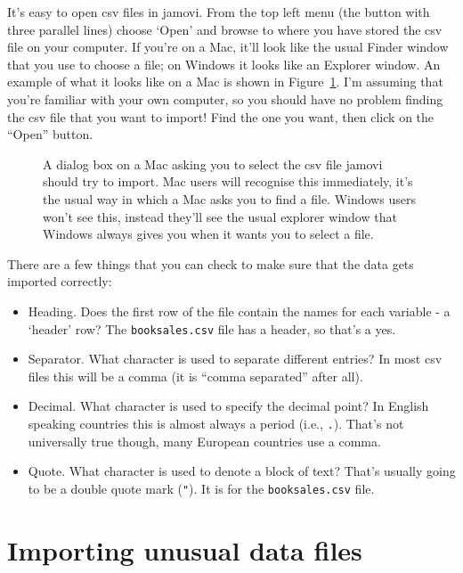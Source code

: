 It's easy to open csv files in jamovi. From the top left menu (the button with three parallel lines) choose `Open' and browse to where you have stored the csv file on your computer. If you're on a Mac, it'll look like the usual Finder window that you use to choose a file; on Windows it looks like an Explorer window. An example of what it looks like on a Mac is shown in Figure~\ref{fig:fileopen}. I'm assuming that you're familiar with your own computer, so you should have no problem finding the csv file that you want to import! Find the one you want, then click on the ``Open'' button. 

\begin{figure}[t]
\begin{center}
\caption{A dialog box on a Mac asking you to select the csv file jamovi should try to import. Mac users will recognise this immediately, it's the usual way in which a Mac asks you to find a file. Windows users won't see this, instead they'll see the usual explorer window that Windows always gives you when it wants you to select a file.}
\label{fig:fileopen}
\end{center}
\end{figure} 

There are a few things that you can check to make sure that the data gets imported correctly: 

\begin{itemize}
\item Heading. Does the first row of the file contain the names for each variable - a `header' row? The \texttt{booksales.csv} file has a header, so that's a yes.
\item Separator. What character is used to separate different entries? In most csv files this will be a comma (it is ``comma separated'' after all).
\item Decimal. What character is used to specify the decimal point? In English speaking countries this is almost always a period (i.e., \texttt{.}). That's not universally true though, many European countries use a comma. 
\item Quote. What character is used to denote a block of text? That's usually going to be a double quote mark (\texttt{"}). It is for the \texttt{booksales.csv} file.
\end{itemize}


\section{Importing unusual data files~\label{sec:importing}}

